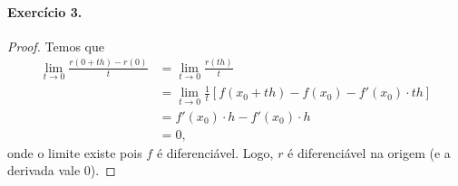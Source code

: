\documentclass[12pt,a4paper]{article}
\begin{document}
\paragraph{Exercício 3.}
    \begin{proof}
        Temos que
        \begin{align*}
            \lim_{t\to 0} \frac{r(0+th) - r(0)}{t} &= \lim_{t\to 0} \frac{r(th)}{t} \\
                                                   &= \lim_{t\to 0} \frac{1}{t}[f(x_0 + th) - f(x_0) 
                                                   - f'(x_0)\cdot th] \\
                                                   &= f'(x_0)\cdot h - f'(x_0)\cdot h \\
                                                   &= 0,
        \end{align*}
        onde o limite existe pois $f$ é diferenciável. Logo, $r$ é diferenciável na origem (e a derivada 
        vale $0$).
    \end{proof}
\end{document}
